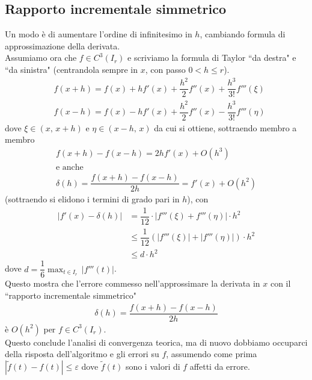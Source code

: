 \documentclass[12pt,a4paper]{article}
\begin{document}
\subsection{Rapporto incrementale simmetrico}
Un modo è di aumentare l'ordine di infinitesimo in $h$, cambiando formula di approssimazione della derivata.\\
Assumiamo ora che $f\in C^3(I_r)$ e scriviamo la formula di Taylor ``da destra" e ``da sinistra" (centrandola sempre in $x$, con passo $0<h\leq r$).
\[ \begin{split}
	& f(x+h)=f(x)+hf'(x)+\dfrac{h^2}{2}f''(x)+\dfrac{h^3}{3!}f'''(\xi) \\
	& f(x-h)=f(x)-hf'(x)+\dfrac{h^2}{2}f''(x)-\dfrac{h^3}{3!}f'''(\eta)
\end{split} \]
dove $\xi \in (x, \, x+h)$ e $\eta \in (x-h, \, x)$ da cui si ottiene, sottraendo membro a membro
\begin{gather*}
	f(x+h)-f(x-h)=2hf'(x)+O(h^3)\\
	\text{e anche}\\
	\delta (h) = \dfrac{f(x+h)-f(x-h)}{2h} = f'(x) + O(h^2)
\end{gather*} 
(sottraendo si elidono i termini di grado pari in $h$), con
\[ \begin{split}
	|f'(x)-\delta(h)|& =\dfrac{1}{12}\cdot |f'''(\xi)+f'''(\eta)|\cdot h^2 \\
	& \leq \dfrac{1}{12}\left( |f'''(\xi)| + |f'''(\eta)| \right) \cdot h^2 \\
	& \leq d\cdot h^2
\end{split} \]
dove $d=\dfrac{1}{6} \max_{t \in I_r} \, |f'''(t)|$.\\
Questo mostra che l'errore
commesso nell'approssimare la derivata in $x$ con il ``rapporto incrementale simmetrico"
\[ \begin{split}
	\delta (h) = \dfrac{f(x+h)-f(x-h)}{2h}
\end{split} \]
è $O(h^2)$ per $f \in C^3(I_r)$.\\
Questo conclude l'analisi di convergenza teorica, ma di nuovo dobbiamo occuparci della risposta dell'algoritmo e gli errori su $f$, assumendo come prima $|\widetilde{f}(t)-f(t)| \leq \varepsilon$ dove $\widetilde{f}(t)$ sono i valori di $f$ affetti da errore.\\
\end{document}
